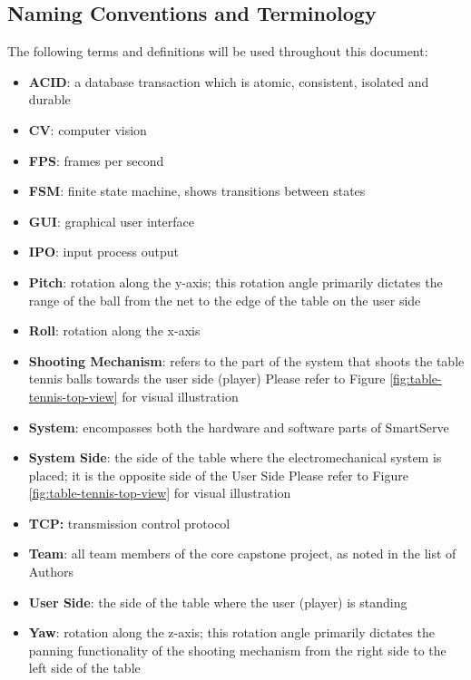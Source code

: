 \documentclass[11pt]{article}
\begin{document}
\subsection{Naming Conventions and Terminology}
\label{sec:definitions}
The following terms and definitions will be used throughout this document:
\begin{itemize}
\item \textbf{ACID}: a database transaction which is atomic, consistent, isolated and durable
\item \textbf{CV}: computer vision
\item \textbf{FPS}: frames per second
\item \textbf{FSM}: finite state machine, shows transitions between states
\item \textbf{GUI}: graphical user interface
\item \textbf{IPO}: input process output
\item \textbf{Pitch}: rotation along the y-axis; this rotation angle primarily dictates the range of the ball from the net to the edge of the table on the user side
\item \textbf{Roll}: rotation along the x-axis
\item \textbf{Shooting Mechanism}: refers to the part of the system that shoots the table tennis balls towards the user side (player) Please refer to Figure \ref{fig:table-tennis-top-view} for visual illustration
\item \textbf{System}: encompasses both the hardware and software parts of SmartServe
\item \textbf{System Side}: the side of the table where the electromechanical system is placed; it is the opposite side of the User Side Please refer to Figure \ref{fig:table-tennis-top-view} for visual illustration
\item \textbf{TCP:} transmission control protocol
\item \textbf{Team}: all team members of the core capstone project, as noted in the list of Authors
\item \textbf{User Side}: the side of the table where the user (player) is standing
\item \textbf{Yaw}: rotation along the z-axis; this rotation angle primarily dictates the panning functionality of the shooting mechanism from the right side to the left side of the table
\end{itemize}
\end{document}
